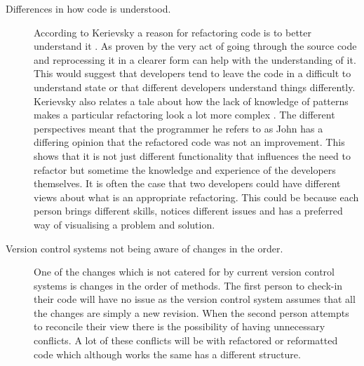 \begin{description}
\item [Differences in how code is understood.]    
According to  Kerievsky a reason for refactoring code is to better understand it \cite{Kerievsky2004}. As proven by \cite{Bois2005} the very act of going through the source code and reprocessing it in a clearer form can help with the understanding of it. This would suggest that developers tend to leave the code in a difficult to understand state or that different developers understand things differently.
Kerievsky also relates a tale about how the lack of knowledge of patterns makes a particular refactoring look a lot more complex \cite{Kerievsky2004}. The different perspectives meant that the programmer he refers to as John has a differing opinion that the refactored code was not an improvement. This shows that it is not just different functionality that influences the need to refactor but sometime the knowledge and experience of the developers themselves. It is often the case that two developers could have different views about what is an appropriate refactoring. This could be because each person brings different skills, notices different issues and has a preferred way of visualising a problem and solution.
\item [Version control systems not being aware of changes in the order.]
One of the changes which is not catered for by current version control systems is changes in the order of methods.  The first person to check-in their code will have no issue as the version control system assumes that all the changes are simply a new revision.  When the second person attempts to reconcile their view there is the possibility of having unnecessary conflicts.  A lot of these conflicts will be with refactored or reformatted code which although works the same has a different structure.
\end{description}


